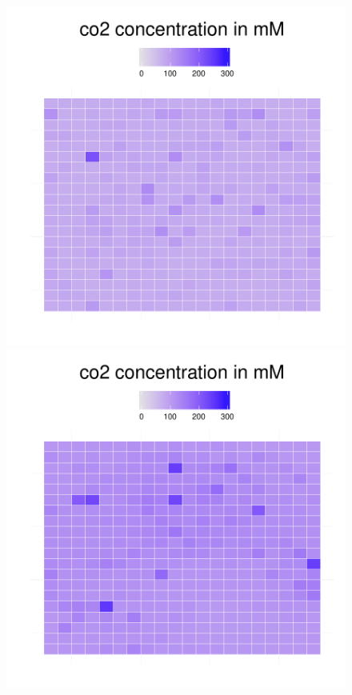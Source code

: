 \begin{figure}[h!]
{\begin{minipage}[t]{0.3\textwidth}
  \end{minipage}
  \begin{minipage}[t]{0.3\textwidth}
    \includegraphics[width=\textwidth]{../results/barkeri_ecoli_20x20_seed4612_meth100a.pdf}
  \end{minipage}
  \begin{minipage}[t]{0.3\textwidth}
    \includegraphics[width=\textwidth]{../results/barkeri_ecoli_20x20_seed4612_meth130.pdf}

\end{minipage}}
\end{figure}
